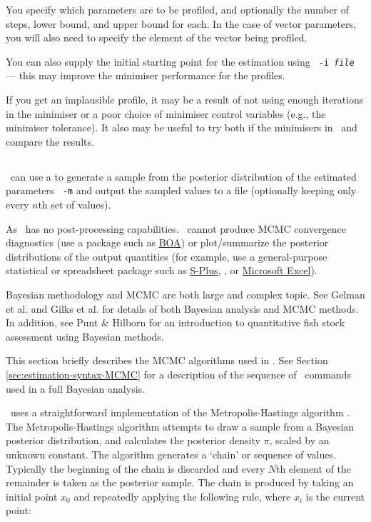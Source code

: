 You specify which parameters are to be profiled, and optionally the number of steps, lower bound, and upper bound for each. In the case of vector parameters, you will also need to specify the element of the vector being profiled.

You can also supply the initial starting point for the estimation using \texttt{\cname\ -i \emph{file}} --- this may improve the minimiser performance for the profiles.

If you get an implausible profile, it may be a result of not using enough iterations in the minimiser or a poor choice of minimiser control variables (e.g., the minimiser tolerance). It also may be useful to try both if the minimisers in \CNAME\ and compare the results.

\subsection{\label{sec:estimate-MCMC}}

\CNAME\ can use a  to generate a sample from the posterior distribution of the estimated parameters \texttt{\cname\ -m} and output the sampled values to a file (optionally keeping only every $n$th set of values).

As \CNAME\ has no post-processing capabilities. \CNAME\ cannot produce MCMC convergence diagnostics (use a package such as \href{http://www.public-health.uiowa.edu/boa}{BOA}) or plot/summarize the posterior distributions of the output quantities (for example, use a general-purpose statistical or spreadsheet package such as \href{http://www.insightful.com}{S-Plus}, \href{http://www.r-project.org}{\R}, or \href{http://www.microsoft.com}{Microsoft Excel}).

Bayesian methodology and MCMC are both large and complex topic. See Gelman et al. \citeyearpar{823} and Gilks et al. \citeyearpar{143} for details of both Bayesian analysis and MCMC methods. In addition, see Punt \& Hilborn \citeyearpar{828} for an introduction to quantitative fish stock assessment using Bayesian methods.

This section briefly describes the MCMC algorithms used in \CNAME. See Section \ref{sec:estimation-syntax-MCMC} for a description of the sequence of \CNAME\ commands used in a full Bayesian analysis.

\CNAME\ uses a straightforward implementation of the Metropolis-Hastings algorithm \citep{823,143}. The Metropolis-Hastings algorithm attempts to draw a sample from a Bayesian posterior distribution, and calculates the posterior density $\pi$, scaled by an unknown constant. The algorithm generates a `chain' or sequence of values. Typically the beginning of the chain is discarded and every $N$th element of the remainder is taken as the posterior sample. The chain is produced by taking an initial point $x_0$ and repeatedly applying the following rule, where $x_i$ is the current point:

